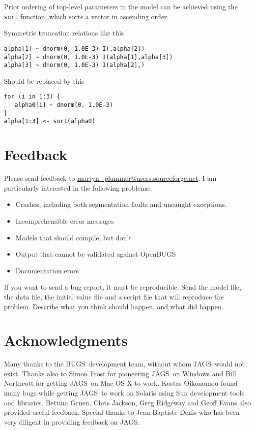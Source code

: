 \documentclass[11pt, a4paper, titlepage]{report}
\newcommand{\JAGS}{\textsf{JAGS}}
\newcommand{\BUGS}{\textsf{BUGS}}
\newcommand{\OpenBUGS}{\textsf{OpenBUGS}}
\begin{document}
Prior ordering of top-level parameters in the model can be achieved
using the \texttt{sort} function, which sorts a vector in ascending
order.

Symmetric truncation relations like this
\begin{verbatim}
alpha[1] ~ dnorm(0, 1.0E-3) I(,alpha[2])
alpha[2] ~ dnorm(0, 1.0E-3) I(alpha[1],alpha[3])
alpha[3] ~ dnorm(0, 1.0E-3) I(alpha[2],)
\end{verbatim}
Should be replaced by this
\begin{verbatim}
for (i in 1:3) {
   alpha0[i] ~ dnorm(0, 1.0E-3)
}
alpha[1:3] <- sort(alpha0)
\end{verbatim}

\chapter{Feedback}

Please send feedback to \url{martyn_plummer@users.sourceforge.net}.
I am particularly interested in the following problems:

\begin{itemize}
\item Crashes, including both segmentation faults and uncaught exceptions.
\item Incomprehensible error messages
\item Models that should compile, but don't 
\item Output that cannot be validated against \OpenBUGS
\item Documentation erors
\end{itemize}

If you want to send a bug report, it must be reproducible. Send the
model file, the data file, the initial value file and a script file
that will reproduce the problem. Describe what you think should
happen, and what did happen.

\chapter{Acknowledgments}

Many thanks to the \BUGS\ development team, without whom \JAGS\ would
not exist.  Thanks also to Simon Frost for pioneering \JAGS\ on
Windows and Bill Northcott for getting \JAGS\ on Mac OS X to
work. Kostas Oikonomou found many bugs while getting \JAGS\ to work on
Solaris using Sun development tools and libraries.  Bettina Gruen,
Chris Jackson, Greg Ridgeway and Geoff Evans also provided useful
feedback.  Special thanks to Jean-Baptiste Denis who has been very
diligent in providing feedback on JAGS.



\end{document}
